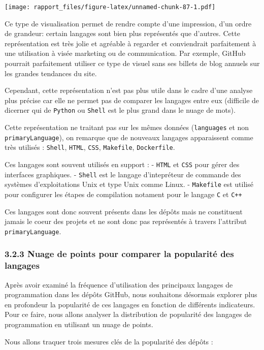 \documentclass[
]{article}
\begin{document}
\texttt{[image: rapport\_files/figure-latex/unnamed-chunk-87-1.pdf]}

Ce type de visualisation permet de rendre compte d'une impression, d'un
ordre de grandeur: certain langages sont bien plus représentés que
d'autres. Cette représentation est très jolie et agréable à regarder et
conviendrait parfaitement à une utilisation à visée marketing ou de
communication. Par exemple, GitHub pourrait parfaitement utiliser ce
type de visuel sans ses billets de blog annuels sur les grandes
tendances du site.

Cependant, cette représentation n'est pas plus utile dans le cadre d'une
analyse plus précise car elle ne permet pas de comparer les langages
entre eux (difficile de dicerner qui de \texttt{Python} ou
\texttt{Shell} est le plus grand dans le nuage de mots).

Cette représentation ne traitant pas sur les mêmes données
(\texttt{languages} et non \texttt{primaryLanguage}), on remarque que de
nouveaux langages apparaissent comme très utilisés : \texttt{Shell},
\texttt{HTML}, \texttt{CSS}, \texttt{Makefile}, \texttt{Dockerfile}.

Ces langages sont souvent utilisés en support : - \texttt{HTML} et
\texttt{CSS} pour gérer des interfaces graphiques. - \texttt{Shell} est
le langage d'intepréteur de commande des systèmes d'exploitations Unix
et type Unix comme Linux. - \texttt{Makefile} est utilisé pour
configurer les étapes de compilation notament pour le langage \texttt{C}
et \texttt{C++}

Ces langages sont donc souvent présents dans les dépôts mais ne
constituent jamais le coeur des projets et ne sont donc pas représentés
à travers l'attribut \texttt{primaryLanguage}.

\subsubsection{3.2.3 Nuage de points pour comparer la popularité des
langages}\label{nuage-de-points-pour-comparer-la-popularituxe9-des-langages}

Après avoir examiné la fréquence d'utilisation des principaux langages
de programmation dans les dépôts GitHub, nous souhaitons désormais
explorer plus en profondeur la popularité de ces langages en fonction de
différents indicateurs. Pour ce faire, nous allons analyser la
distribution de popularité des langages de programmation en utilisant un
nuage de points.

Nous allons traquer trois mesures clés de la popularité des dépôts :
\end{document}
